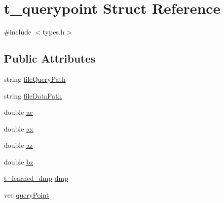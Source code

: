 \hypertarget{structt__querypoint}{\section{t\-\_\-querypoint \-Struct \-Reference}
\label{structt__querypoint}
}


{\ttfamily \#include $<$types.\-h$>$}

\subsection*{\-Public \-Attributes}
\begin{DoxyCompactItemize}
\item 
string \hyperlink{structt__querypoint_a06433d9bd1bff33eff29d440991da6e3}{file\-Query\-Path}
\item 
string \hyperlink{structt__querypoint_a22c3e798c191b6fd807d7c5db3b0ca40}{file\-Data\-Path}
\item 
double \hyperlink{structt__querypoint_a9bdfc6ab1c34ebea15ae610e78f03500}{ac}
\item 
double \hyperlink{structt__querypoint_a3d81596351adec6c28868e295b7de692}{ax}
\item 
double \hyperlink{structt__querypoint_a802060bc71cf6bf41cdcfc05885fecf2}{az}
\item 
double \hyperlink{structt__querypoint_a288e26a9d76cda6da4349eade6979b86}{bz}
\item 
\hyperlink{structt__learned__dmp}{t\-\_\-learned\-\_\-dmp} \hyperlink{structt__querypoint_a9a6ae23aab5b144e0d45d5b5853de879}{dmp}
\item 
vec \hyperlink{structt__querypoint_a7211a8a160d53bf60704f513e5504825}{query\-Point}
\end{DoxyCompactItemize}


